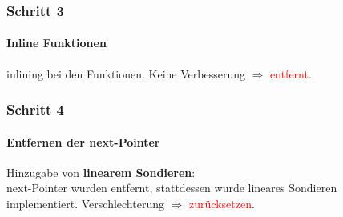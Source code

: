 \documentclass{beamer}
\newcommand{\fail}[1]{\textcolor{red}{#1}}
\begin{document}
  \begin{frame}
  	\frametitle{Schritt 3}
  	\framesubtitle{Inline Funktionen}
  	\sThree
  	inlining bei den Funktionen.
  	Keine Verbesserung $\Rightarrow$ \fail{entfernt}.
  \end{frame}
  
  \begin{frame}
  	\frametitle{Schritt 4}
  	\framesubtitle{Entfernen der next-Pointer}
  	\sFourOne
  	Hinzugabe von \textbf{linearem Sondieren}:\\[1em]
  	\sFourTwo
  	next-Pointer wurden entfernt, stattdessen wurde lineares Sondieren implementiert.
  	Verschlechterung $\Rightarrow$ \fail{zur\"ucksetzen}.  
  \end{frame}
  
\end{document}
